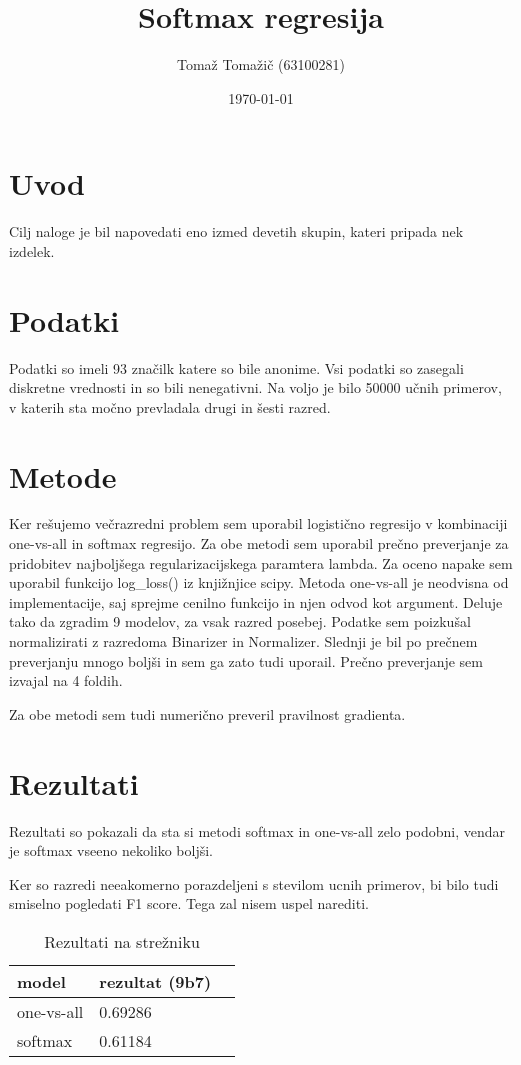 \documentclass[a4paper,11pt]{article}
\title{Softmax regresija}
\author{Tomaž Tomažič (63100281)}
\date{\today}
\begin{document}
\maketitle

\section{Uvod}

Cilj naloge je bil napovedati eno izmed devetih skupin, kateri pripada nek izdelek.

\section{Podatki}

Podatki so imeli 93 značilk katere so bile anonime. Vsi podatki so zasegali diskretne vrednosti in so bili nenegativni.
Na voljo je bilo 50000 učnih primerov, v katerih sta močno prevladala drugi in šesti razred.

\section{Metode}

Ker rešujemo večrazredni problem sem uporabil logistično regresijo v kombinaciji one-vs-all in softmax regresijo. Za obe metodi sem uporabil prečno preverjanje za pridobitev najboljšega regularizacijskega paramtera lambda. Za oceno napake sem uporabil funkcijo log\_loss() iz knjižnjice scipy.
Metoda one-vs-all je neodvisna od implementacije, saj sprejme cenilno funkcijo in njen odvod kot argument. Deluje tako da zgradim 9 modelov, za vsak razred posebej.
Podatke sem poizkušal normalizirati z razredoma Binarizer in Normalizer. Slednji je bil po prečnem preverjanju mnogo boljši in sem ga zato tudi uporail. Prečno preverjanje sem izvajal na 4 foldih.

Za obe metodi sem tudi numerično preveril pravilnost gradienta.

\section{Rezultati}

Rezultati so pokazali da sta si metodi softmax in one-vs-all zelo podobni, vendar je softmax vseeno nekoliko boljši.

Ker so razredi neeakomerno porazdeljeni s stevilom ucnih primerov, bi bilo tudi smiselno pogledati F1 score. Tega zal nisem uspel narediti.
\begin{table}[htbp]
\caption{Rezultati na strežniku}
\label{tab1}
\begin{center}
\begin{tabular}{llp{3cm}}
\hline
model & rezultat (9b7)\\
\hline
one-vs-all & 0.69286 \\
softmax & 0.61184 \\
\hline
\end{tabular}
\end{center}
\end{table}
\end{document}
